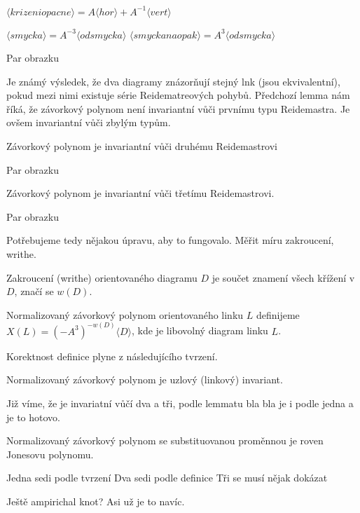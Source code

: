 \begin{dusl}
$ \langle krizeni opacne  \rangle = A  \langle hor \rangle + A^{-1}  \langle vert \rangle $
\end{dusl}

\begin{lemma}
$ \langle smycka \rangle = A^{-3} \langle odsmycka \rangle$
$ \langle smycka naopak \rangle = A^{3} \langle odsmycka \rangle$
\end{lemma}
\begin{dukaz}
Par obrazku
\end{dukaz}

Je známý výsledek, že dva diagramy znázorňují stejný lnk (jsou ekvivalentní), pokud mezi nimi existuje série Reidematreových pohybů. Předchozí lemma nám říká, že závorkový polynom není invariantní vůči prvnímu typu Reidemastra. Je ovšem invariantní vůči zbylým typům.

\begin{tvrz}
Závorkový polynom je invariantní vůči druhému Reidemastrovi
\end{tvrz}
\begin{dukaz}
Par obrazku
\end{dukaz}

\begin{dusl}
Závorkový polynom je invariantní vůči třetímu Reidemastrovi.
\end{dusl}
\begin{dukaz}
Par obrazku
\end{dukaz}

Potřebujeme tedy nějakou úpravu, aby to fungovalo. Měřit míru zakroucení, writhe.

\begin{definice}
Zakroucení (writhe) orientovaného diagramu $D$ je součet znamení všech křížení v $D$, značí se $w(D)$.
\end{definice}

\begin{definice}
Normalizovaný závorkový polynom orientovaného linku $L$ definijeme $X(L) = (-A^3)^{-w(D)}\langle D \rangle$, kde je libovolný diagram linku $L$.
\end{definice}

Korektnost definice plyne z následujícího tvrzení.

\begin{tvrz}
Normalizovaný závorkový polynom je uzlový (linkový) invariant.
\end{tvrz}
\begin{dukaz}
Již víme, že je invariatní vůčí dva a tři, podle lemmatu bla bla je i podle jedna a je to hotovo.
\end{dukaz}

\begin{veta}
Normalizovaný závorkový polynom se substituovanou proměnnou je roven Jonesovu polynomu.
\end{veta}
\begin{dukaz}
Jedna sedi podle tvrzení
Dva sedi podle definice
Tři se musí nějak dokázat
\end{dukaz}


Ještě ampirichal knot?
Asi už je to navíc.

